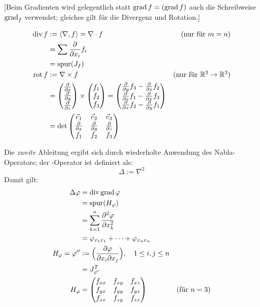 [Beim Gradienten wird gelegentlich statt $\operatorname{grad} f = (\operatorname{grad} f)$ auch die Schreibweise $\operatorname{grad}_f$ verwendet; gleiches gilt für die Divergenz und Rotation.]

\begin{align*}
\adiv f &:= \langle \nabla, f \rangle = \nabla\cdot f & \hbox{(nur für $m=n$)} \\
        & = \sum \frac{\partial}{\partial x_i} f_i \\
        & = \spur(J_f) \\
\rot f  &:= \nabla \times f & \hbox{(nur für $\mathbb{R}^3 \to \mathbb{R}^3$)} \nonumber \\
        &= \veccc(\frac{\partial}{\partial x}; \frac{\partial}{\partial y}; \frac{\partial}{\partial z}) \times \veccc(f_1;f_2;f_3)
         = \veccc(\frac{\partial}{\partial y} f_3 - \frac{\partial}{\partial z} f_2;
                  \frac{\partial}{\partial z} f_1 - \frac{\partial}{\partial x} f_3;
                  \frac{\partial}{\partial x} f_2 - \frac{\partial}{\partial y} f_1) \\
       &= \det \begin{pmatrix}
            \vec e_1                    & \vec e_2                    & \vec e_3 \\
            \frac{\partial}{\partial x} & \frac{\partial}{\partial y} & \frac{\partial}{\partial z} \\
            f_1                         & f_2                         & f_3
          \end{pmatrix}
\end{align*}

Die \emph{zweite} Ableitung ergibt sich durch wiederholte Anwendung des Nabla-Operators; der -Operator ist definiert als:
\[ \Delta := \nabla^2 \]
Damit gilt:
\begin{align}
  \Delta \varphi & = \operatorname{div} \operatorname{grad} \varphi \nonumber \\
                             & = \operatorname{spur}(H_\varphi) \nonumber \\
                             & = \sum_{k=1}^n \frac{\partial^2 \varphi}{\partial x_k^2} \nonumber \\
                             & = \varphi_{x_1 x_1} + \cdots + \varphi_{x_n x_n} \nonumber \\
  H_\varphi = \varphi'' & := \Bigl( \frac{\partial \varphi}{\partial x_i \partial x_j} \Bigr),\quad 1 \leq i,j \leq n \label{eq:hesse-matrix} \\
                        & = J_{\varphi'}^T \nonumber \\
  H_\varphi & = \begin{pmatrix}
            	f_{xx} & f_{xy} & f_{xz} \\
            	f_{yx} & f_{yy} & f_{yz} \\
            	f_{zx} & f_{zy} & f_{zz}
            \end{pmatrix} & \hbox{(für $n=3$)} \nonumber
\end{align}

